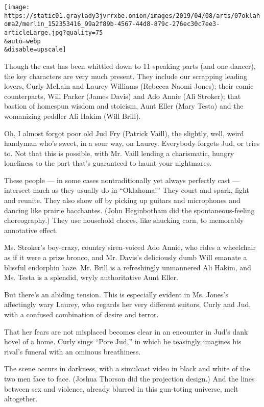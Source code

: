 \texttt{[image: https://static01.graylady3jvrrxbe.onion/images/2019/04/08/arts/07oklahoma2/merlin\_152353416\_99a2f89b-4567-44d8-879c-276ec30c7ee3-articleLarge.jpg?quality=75\\\&auto=webp\\\&disable=upscale]}

Though the cast has been whittled down to 11 speaking parts (and one
dancer), the key characters are very much present. They include our
scrapping leading lovers, Curly McLain and Laurey Williams (Rebecca
Naomi Jones); their comic counterparts, Will Parker (James Davis) and
Ado Annie (Ali Stroker); that bastion of homespun wisdom and stoicism,
Aunt Eller (Mary Testa) and the womanizing peddler Ali Hakim (Will
Brill).

Oh, I almost forgot poor old Jud Fry (Patrick Vaill), the slightly,
well, weird handyman who's sweet, in a sour way, on Laurey. Everybody
forgets Jud, or tries to. Not that this is possible, with Mr. Vaill
lending a charismatic, hungry loneliness to the part that's guaranteed
to haunt your nightmares.

These people --- in some cases nontraditionally yet always perfectly
cast --- intersect much as they usually do in ``Oklahoma!'' They court
and spark, fight and reunite. They also show off by picking up guitars
and microphones and dancing like prairie bacchantes. (John Heginbotham
did the spontaneous-feeling choreography.) They use household chores,
like shucking corn, to memorably annotative effect.

Ms. Stroker's boy-crazy, country siren-voiced Ado Annie, who rides a
wheelchair as if it were a prize bronco, and Mr. Davis's deliciously
dumb Will emanate a blissful endorphin haze. Mr. Brill is a refreshingly
unmannered Ali Hakim, and Ms. Testa is a splendid, wryly authoritative
Aunt Eller.

But there's an abiding tension. This is especially evident in Ms.
Jones's affectingly wary Laurey, who regards her very different suitors,
Curly and Jud, with a confused combination of desire and terror.

That her fears are not misplaced becomes clear in an encounter in Jud's
dank hovel of a home. Curly sings ``Pore Jud,'' in which he teasingly
imagines his rival's funeral with an ominous breathiness.

The scene occurs in darkness, with a simulcast video in black and white
of the two men face to face. (Joshua Thorson did the projection design.)
And the lines between sex and violence, already blurred in this
gun-toting universe, melt altogether.

